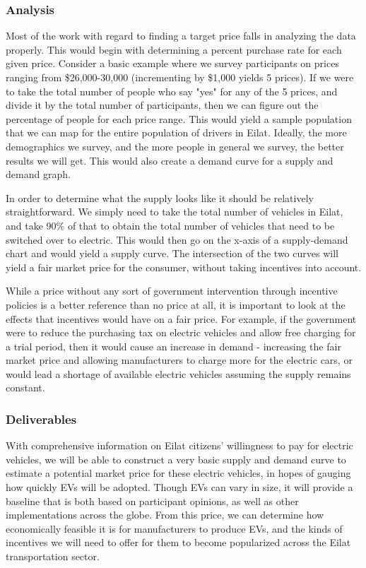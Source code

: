 \documentclass{article}                         %
\begin{document}
\subsubsection{Analysis}
Most of the work with regard to finding a target price falls in analyzing the data properly. This would begin with determining a percent purchase rate for each given price. Consider a basic example where we survey participants on prices ranging from \$26,000-30,000 (incrementing by \$1,000 yields 5 prices). If we were to take the total number of people who say "yes" for any of the 5 prices, and divide it by the total number of participants, then we can figure out the percentage of people for each price range. This would yield a sample population that we can map for the entire population of drivers in Eilat. Ideally, the more demographics we survey, and the more people in general we survey, the better results we will get. This would also create a demand curve for a supply and demand graph.

In order to determine what the supply looks like it should be relatively straightforward. We simply need to take the total number of vehicles in Eilat, and take 90\% of that to obtain the total number of vehicles that need to be switched over to electric. This would then go on the x-axis of a supply-demand chart and would yield a supply curve. The intersection of the two curves will yield a fair market price for the consumer, without taking incentives into account.

While a price without any sort of government intervention through incentive policies is a better reference than no price at all, it is important to look at the effects that incentives would have on a fair price. For example, if the government were to reduce the purchasing tax on electric vehicles and allow free charging for a trial period, then it would cause an increase in demand - increasing the fair market price and allowing manufacturers to charge more for the electric cars, or would lead a shortage of available electric vehicles assuming the supply remains constant.

\subsubsection{Deliverables}
With comprehensive information on Eilat citizens' willingness to pay for electric vehicles, we will be able to construct a very basic supply and demand curve to estimate a potential market price for these electric vehicles, in hopes of gauging how quickly EVs will be adopted. Though EVs can vary in size, it will provide a baseline that is both based on participant opinions, as well as other implementations across the globe. From this price, we can determine how economically feasible it is for manufacturers to produce EVs, and the kinds of incentives we will need to offer for them to become popularized across the Eilat transportation sector.
\end{document}
